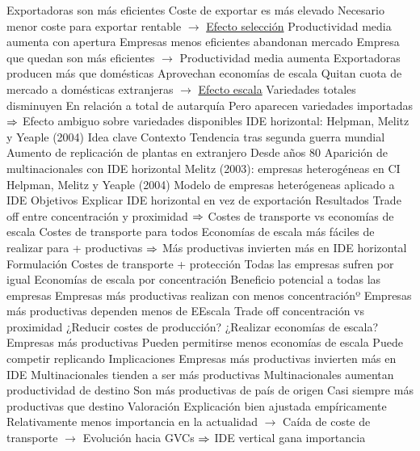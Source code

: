 \documentclass{nuevotema}
\begin{document}
\begin{esquemal}
				\4 Exportadoras son más eficientes
				\4[] Coste de exportar es más elevado
				\4[] Necesario menor coste para exportar rentable
				\4[] $\to$ \underline{Efecto selección}
				\4 Productividad media aumenta con apertura
				\4[] Empresas menos eficientes abandonan mercado
				\4[] Empresa que quedan son más eficientes
				\4[] $\to$ Productividad media aumenta
				\4 Exportadoras producen más que domésticas
				\4[] Aprovechan economías de escala
				\4[] Quitan cuota de mercado a domésticas extranjeras
				\4[] $\to$ \underline{Efecto escala}
				\4 Variedades totales disminuyen
				\4[] En relación a total de autarquía
				\4[] Pero aparecen variedades importadas
				\4[] $\Rightarrow$ Efecto ambiguo sobre variedades disponibles
		\2 IDE horizontal: Helpman, Melitz y Yeaple (2004)
			\3 Idea clave
				\4 Contexto
				\4[] Tendencia tras segunda guerra mundial
				\4[] Aumento de replicación de plantas en extranjero
				\4[] Desde años 80
				\4[] Aparición de multinacionales con IDE horizontal
				\4[] Melitz (2003): empresas heterogéneas en CI
				\4[] Helpman, Melitz y Yeaple (2004)
				\4[] Modelo de empresas heterógeneas aplicado a IDE
				\4 Objetivos
				\4[] Explicar IDE horizontal en vez de exportación
				\4 Resultados
				\4[] Trade off entre concentración y proximidad
				\4[] $\Rightarrow$ Costes de transporte vs economías de escala
				\4[] Costes de transporte para todos
				\4[] Economías de escala más fáciles de realizar para + productivas
				\4[] $\Rightarrow$ Más productivas invierten más en IDE horizontal
			\3 Formulación
				\4 Costes de transporte + protección
				\4[] Todas las empresas sufren por igual
				\4 Economías de escala por concentración
				\4[] Beneficio potencial a todas las empresas
				\4[] Empresas más productivas realizan con menos concentraciónº
				\4[] Empresas más productivas dependen menos de EEscala
				\4 Trade off concentración vs proximidad
				\4[] ¿Reducir costes de producción?
				\4[] ¿Realizar economías de escala?
				\4 Empresas más productivas
				\4[] Pueden permitirse menos economías de escala
				\4[] Puede competir replicando
			\3 Implicaciones
				\4 Empresas más productivas invierten más en IDE
				\4 Multinacionales tienden a ser más productivas
				\4 Multinacionales aumentan productividad de destino
				\4[] Son más productivas de país de origen
				\4[] Casi siempre más productivas que destino
			\3 Valoración
				\4[] Explicación bien ajustada empíricamente
				\4[] Relativamente menos importancia en la actualidad
				\4[] $\to$ Caída de coste de transporte
				\4[] $\to$ Evolución hacia GVCs
				\4[] $\Rightarrow$ IDE vertical gana importancia

\end{esquemal}
\end{document}
